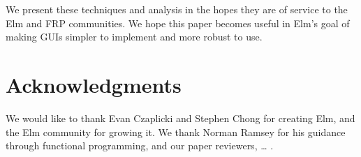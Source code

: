 \documentclass{article}
\begin{document}
We present these techniques and analysis in the hopes they are of
service to the Elm and FRP communities. We hope this paper becomes
useful in Elm's goal of making GUIs simpler to implement and more robust
to use.

\section*{Acknowledgments}
We would like to thank Evan Czaplicki and Stephen Chong for creating
Elm, and the Elm community for growing it. We thank Norman Ramsey for
his guidance through functional programming, and our paper reviewers,
\ldots{} .



\end{document}
